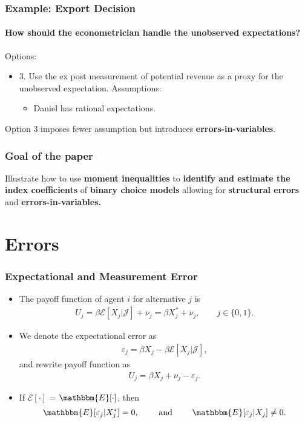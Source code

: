\begin{frame}
\frametitle{Example: Export Decision}
\framesubtitle{How should the econometrician handle the unobserved expectations?}

Options:
\begin{itemize}
	\item 3. Use the ex post measurement of potential revenue as a proxy for the unobserved expectation. Assumptions:
	\begin{itemize}
		\item Daniel has rational expectations.
	\end{itemize}
\end{itemize}
Option 3 imposes fewer assumption but introduces \textbf{errors-in-variables}.
\end{frame}
\begin{frame}
\frametitle{Goal of the paper}

Illustrate how to use \textbf{moment inequalities} to \textbf{identify and estimate the index coefficients}
of \textbf{binary choice models} allowing for \textbf{structural errors}
and \textbf{errors-in-variables.}

\end{frame}
\section{Errors}
\begin{frame}
\frametitle{Expectational and Measurement Error}

\begin{itemize}
	\item The payoff function of agent $i$ for alternative $j$ is
	\begin{align*}
	U_{j} = \beta\mathcal{E}[X_{j}|\mathcal{J}]+\nu_{j}= \beta X^{*}_{j}+\nu_{j},\qquad j \in \{0,1\}.
	\end{align*}
	\item We denote the expectational error as
	\begin{align*}
	\varepsilon_{j} = \beta X_{j}-\beta \mathcal{E}[X_{j}|\mathcal{J}],
	\end{align*}
	and rewrite payoff function as
	\begin{align*}
	U_{j} = \beta X_{j}+\nu_{j}-\varepsilon_{j}.
	\end{align*}
	\item If $\mathcal{E}[\cdot]$ = $\mathbbm{E}[\cdot]$, then
	\begin{equation*}
	\mathbbm{E}[\varepsilon_{j}|X^{*}_{j}]=0,\qquad\text{ and }\qquad\mathbbm{E}[\varepsilon_{j}|X_{j}]\neq0.
	\end{equation*}
\end{itemize}
\end{frame}

